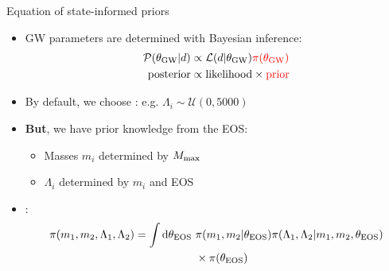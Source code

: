 \documentclass[usenames,dvipsnames,t]{beamer}
\begin{document}
\begin{frame}{Equation of state-informed priors}
  \def\x{4mm}
  \def\y{1mm}

  \begin{itemize}
    \item GW parameters are determined with Bayesian inference:
    \begin{align*}
      \mathcal{P}(\theta_{\rm{GW}} | d ) &\propto \mathcal{L}(d | \theta_{\rm{GW}}) \textcolor{red}{\pi(\theta_{\rm{GW}})} \\
      \rm{posterior} &\propto \rm{likelihood} \times \rm{\textcolor{red}{prior}} \\
    \end{align*}

    \vspace{-4mm}

    \item By default, we choose \textbf{}: e.g. $\Lambda_i \sim \mathcal{U}(0, 5000)$

    \vspace{\x}
    \pause

    \item \textbf{But}, we have prior knowledge from the EOS:
    \begin{itemize}
      \vspace{\y}
      \item Masses $m_i$ determined by $M_{\rm{max}}$

      \vspace{\y}

      \item $\Lambda_i$ determined by $m_i$ and EOS
    \end{itemize}
    
    \vspace{\x}
    
    \item \textbf{}:
    \begin{align*}
      \pi(m_1, m_2, \Lambda_1, \Lambda_2) = \int \mathop{}\!\mathrm{d} \theta_{\rm{EOS}} \ &\pi(m_1, m_2 | \theta_{\rm{EOS}}) \pi(\Lambda_1, \Lambda_2 | m_1, m_2, \theta_{\rm{EOS}}) \\
      &\times \pi(\theta_{\rm{EOS}})
    \end{align*}
  \end{itemize}
\end{frame}
\end{document}
